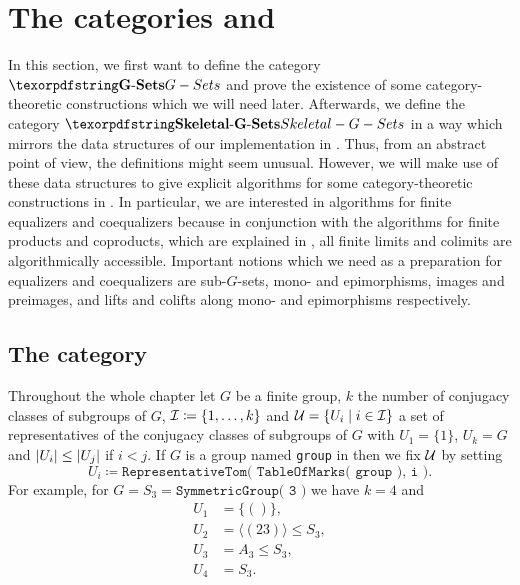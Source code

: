 
\section{The categories \Gset{} and \SkeletalGSets{}}

In this section, we first want to define the category $\Gset$ and prove the existence of some category-theoretic constructions which we will need later. Afterwards, we define the category $\SkeletalGSets$ in a way which mirrors the data structures of our implementation in \CapPkg{}. Thus, from an abstract point of view, the definitions might seem unusual. However, we will make use of these data structures to give explicit algorithms for some category-theoretic constructions in \SkeletalGSets{}. In particular, we are interested in algorithms for finite equalizers and coequalizers because in conjunction with the algorithms for finite products and coproducts, which are explained in \cite{Julia}, all finite limits and colimits are algorithmically accessible. Important notions which we need as a preparation for equalizers and coequalizers are sub-$G$-sets, mono- and epimorphisms, images and preimages, and lifts and colifts along mono- and epimorphisms respectively.

\subsection{The category \Gset{}}

Throughout the whole chapter let $G$ be a finite group, $k$ the number of conjugacy classes of subgroups of $G$, $\mathcal{I} \coloneqq \{1,\dots,k\}$ and $\mathcal{U} = \{U_i \mid i \in \mathcal{I}\}$ a set of representatives of the conjugacy classes of subgroups of $G$ with $U_1 = \{1\}$, $U_k = G$ and ${\lvert U_i\rvert} \leq {\lvert U_j\rvert}$ if $i < j$. If $G$ is a group named \texttt{group} in \GAP{} then we fix $\mathcal{U}$ by setting \[U_i \coloneqq \texttt{RepresentativeTom( TableOfMarks( group ), i )}.\] For example, for $G = S_3 = \texttt{SymmetricGroup( 3 )}$ we have $k = 4$ and
\begin{align*}
U_1 &= \{()\},\\
U_2 &= \langle (23) \rangle \leq S_3,\\
U_3 &= A_3 \leq S_3,\\
U_4 &= S_3.
\end{align*}

